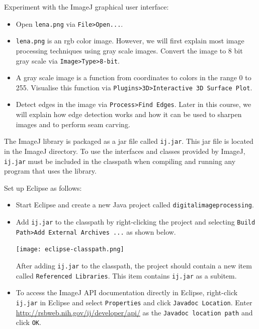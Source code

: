 \documentclass{book}
\begin{document}
\begin{exercise}
Experiment with the ImageJ graphical user interface:
\begin{itemize}
  \item Open \texttt{lena.png} via \texttt{File>Open...}.
  \item \texttt{lena.png} is an rgb color image. However, we will first explain most image processing techniques using gray scale images. Convert the image to 8 bit gray scale via \texttt{Image>Type>8-bit}.
  \item A gray scale image is a function from coordinates to colors in the range 0 to 255. Visualise this function via  \texttt{Plugins>3D>Interactive 3D Surface Plot}. 
  \item Detect edges in the image via \texttt{Process>Find Edges}. Later in this course, we will explain how edge detection works and how it can be used to sharpen images and to perform seam carving.
\end{itemize} 
\end{exercise}

The ImageJ library is packaged as a jar file called \texttt{ij.jar}. This jar file is located in the ImageJ directory. To use the interfaces and classes provided by ImageJ, \texttt{ij.jar} must be included in the classpath when compiling and running any program that uses the library. 

\begin{exercise}
Set up Eclipse as follows:
\begin{itemize}
  \item Start Eclipse and create a new Java project called \texttt{digitalimageprocessing}.
  \item Add \texttt{ij.jar} to the classpath by right-clicking the project and selecting \texttt{Build Path>Add External Archives ...} as shown below.
  \begin{center}
  \texttt{[image: eclipse-classpath.png]}
  \end{center}
  After adding \texttt{ij.jar} to the classpath, the project should contain a new item called \texttt{Referenced Libraries}. This item contains \texttt{ij.jar} as a subitem. 
  \item To access the ImageJ API documentation directly in Eclipse, right-click \texttt{ij.jar} in Eclipse and select \texttt{Properties} and click \texttt{Javadoc Location}. Enter \href{http://rsbweb.nih.gov/ij/developer/api/}{http://rsbweb.nih.gov/ij/developer/api/} as the \texttt{Javadoc location path} and click \texttt{OK}.  
\end{itemize}
\end{exercise}
\end{document}
